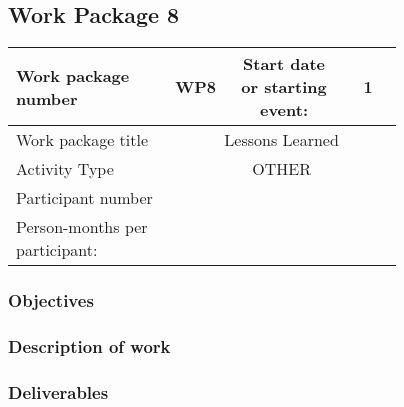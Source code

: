 \subsection{Work Package 8}

\begin{table}[hbpt]\centering
	\begin{tabular}{|p{0.35\linewidth}|p{0.06\linewidth}|p{0.06\linewidth}|p{0.06\linewidth}|
         p{0.06\linewidth}|p{0.06\linewidth}|p{0.06\linewidth}|p{0.06\linewidth}|}\hline
		 Work package number& WP8 &
		 \multicolumn{4}{|c|}{Start date or starting event:}{}&
		 \multicolumn{2}{|c|}{                        1 }{}\\\hline
		 Work package title&\multicolumn{7}{|c|}{ Lessons Learned }{}\\\hline
		 Activity Type&\multicolumn{7}{|c|}{    OTHER}{}\\\hline
		 Participant number & ~ & ~ & ~ & ~ & ~ & ~ & ~ \\\hline
		 Person-months per participant: & ~ & ~ & ~ & ~ & ~ & ~ & ~ \\\hline
	\end{tabular}
\end{table}

\subsubsection{Objectives}

\subsubsection{Description of work}

\subsubsection{Deliverables}